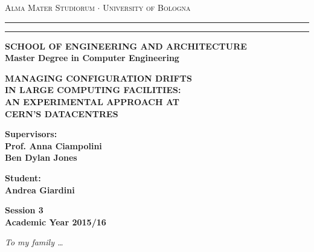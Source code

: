 \documentclass[12pt,a4paper,openright]{report}
\begin{document}
\begin{titlepage}
    \begin{center}
        {{\Large{\textsc{Alma Mater Studiorum $\cdot$ University of
        Bologna}}}} \rule[0.1cm]{15.8cm}{0.1mm}
        \rule[0.5cm]{15.8cm}{0.6mm}
        {\small{\bf SCHOOL OF ENGINEERING AND ARCHITECTURE\\
        Master Degree in Computer Engineering }}
        \end{center}
        \vspace{15mm}
        \begin{center}
        {\LARGE{\bf MANAGING CONFIGURATION DRIFTS}}\\
        \vspace{3mm}
        {\LARGE{\bf IN LARGE COMPUTING FACILITIES:}}\\
        \vspace{3mm}
        {\LARGE{\bf AN EXPERIMENTAL APPROACH AT}}\\
        \vspace{3mm}
        {\LARGE{\bf CERN'S DATACENTRES}}\\
        \end{center}
        \vspace{40mm}
        \par
        \noindent
        \begin{minipage}[t]{0.47\textwidth}
        {\large{\bf Supervisors:\\
        Prof. Anna Ciampolini\\
        Ben Dylan Jones}}
        \end{minipage}
        \hfill
        \begin{minipage}[t]{0.47\textwidth}\raggedleft
        {\large{\bf Student:\\
        Andrea Giardini}}
        \end{minipage}
        \vspace{20mm}
        \begin{center}
        {\large{\bf Session 3\\%
        Academic Year 2015/16}}%
    \end{center}
\end{titlepage}

\begin{titlepage}
    \thispagestyle{empty}
    \topmargin=6.5cm
    \raggedleft
    \large
    \em
    To my family \ldots
    \newpage
    \clearpage{\pagestyle{empty}\cleardoublepage}
\end{titlepage}
\end{document}
